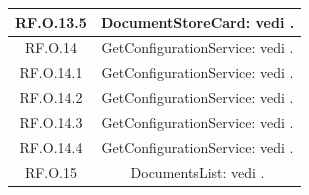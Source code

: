 \documentclass[10pt, a4paper]{article}
\begin{document}
\begin{xltabular}{\textwidth}{c|c}
\hline
RF.O.13.5 & DocumentStoreCard: vedi . \\ 
\hline
RF.O.14 & GetConfigurationService: vedi .\\
\hline
RF.O.14.1 & GetConfigurationService: vedi .\\
\hline
RF.O.14.2 & GetConfigurationService: vedi .\\
\hline
RF.O.14.3 & GetConfigurationService: vedi .\\
\hline
RF.O.14.4 &  GetConfigurationService: vedi .\\
\hline
RF.O.15 & DocumentsList: vedi .\\  


\end{xltabular}
\end{document}
